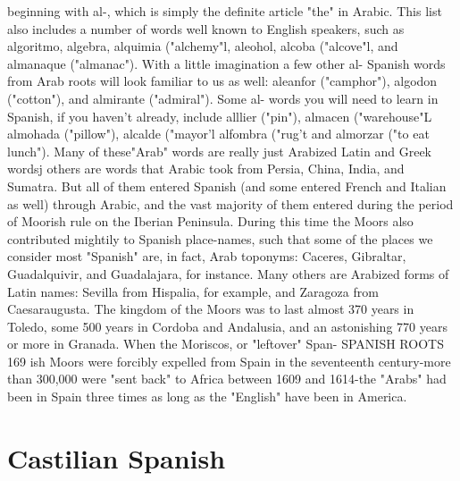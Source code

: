 \documentclass[14pt,a4paper,oneside]{memoir}
\begin{document}
{{{{beginning with al-, which is simply the definite article "the" in Arabic. This list also includes a number of words well known to English
speakers, such as algoritmo, algebra, alquimia ("alchemy"l, aleohol,
alcoba ("alcove"l, and almanaque ("almanac"). With a little imagination a few other al- Spanish words from Arab roots will look familiar
to us as well: aleanfor ("camphor"), algodon ("cotton"), and almirante
("admiral"). Some al- words you will need to learn in Spanish, if you
haven't already, include alllier ("pin"), almacen ("warehouse"L almohada ("pillow"), alcalde ("mayor'l alfombra ("rug't and almorzar
("to eat lunch").
Many of these"Arab" words are really just Arabized Latin and
Greek wordsj others are words that Arabic took from Persia, China, India, and Sumatra. But all of them entered Spanish (and some entered
French and Italian as well) through Arabic, and the vast majority of
them entered during the period of Moorish rule on the Iberian Peninsula. During this time the Moors also contributed mightily to Spanish
place-names, such that some of the places we consider most "Spanish"
are, in fact, Arab toponyms: Caceres, Gibraltar, Guadalquivir, and
Guadalajara, for instance. Many others are Arabized forms of Latin
names: Sevilla from Hispalia, for example, and Zaragoza from Caesaraugusta.
The kingdom of the Moors was to last almost 370 years in Toledo, some 500 years in Cordoba and Andalusia, and an astonishing
770 years or more in Granada. When the Moriscos, or "leftover" Span-
SPANISH ROOTS 169
ish Moors were forcibly expelled from Spain in the seventeenth century-more than 300,000 were "sent back" to Africa between 1609
and 1614-the "Arabs" had been in Spain three times as long as the
"English" have been in America.

\section{Castilian Spanish}

}}}}
\end{document}
